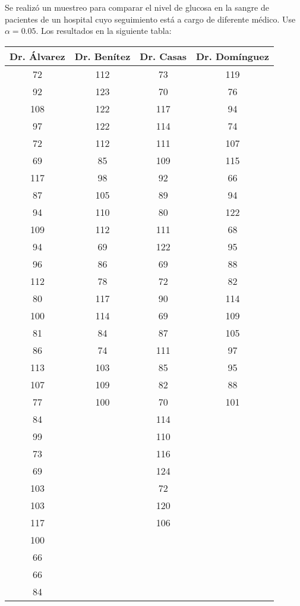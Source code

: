 \documentclass[12pt]{article}
\begin{document}
Se realizó un muestreo para comparar el nivel de glucosa en la sangre de pacientes de un hospital cuyo seguimiento está a cargo de diferente médico. Use $\alpha=0.05$. Los resultados en la siguiente tabla:

\begin{table}[h!]
\centering
\begin{tabular}{|c|c|c|c|}
\hline
\textbf{Dr. Álvarez} & \textbf{Dr. Benítez} & \textbf{Dr. Casas} & \textbf{Dr. Domínguez} \\ \hline
72 & 112 & 73 & 119 \\ \hline
92 & 123 & 70 & 76 \\ \hline
108 & 122 & 117 & 94 \\ \hline
97 & 122 & 114 & 74 \\ \hline
72 & 112 & 111 & 107 \\ \hline
69 & 85 & 109 & 115 \\ \hline
117 & 98 & 92 & 66 \\ \hline
87 & 105 & 89 & 94 \\ \hline
94 & 110 & 80 & 122 \\ \hline
109 & 112 & 111 & 68 \\ \hline
94 & 69 & 122 & 95 \\ \hline
96 & 86 & 69 & 88 \\ \hline
112 & 78 & 72 & 82 \\ \hline
80 & 117 & 90 & 114 \\ \hline
100 & 114 & 69 & 109 \\ \hline
81 & 84 & 87 & 105 \\ \hline
86 & 74 & 111 & 97 \\ \hline
113 & 103 & 85 & 95 \\ \hline
107 & 109 & 82 & 88 \\ \hline
77 & 100 & 70 & 101 \\ \hline
84 & & 114 & \\ \hline
99 & & 110 & \\ \hline
73 & & 116 & \\ \hline
69 & & 124 & \\ \hline
103 & & 72 & \\ \hline
103 & & 120 & \\ \hline
117 & & 106 & \\ \hline
100 & & & \\ \hline
66 & & & \\ \hline
66 & & & \\ \hline
84 & & & \\ \hline
\end{tabular}
\label{tab:glucosa}
\end{table}
\end{document}
